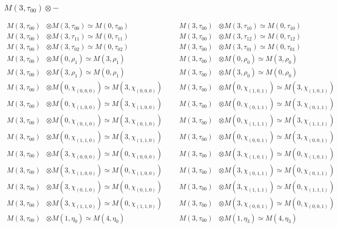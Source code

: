 \subsubsection{$ M(3,\tau_{00})\otimes -$}
\begin{align*}
M(3,\tau_{00}) &\otimes M(3,\tau_{00}) \simeq M(0,\tau_{00}) &&& M(3,\tau_{00}) &\otimes M(3,\tau_{10}) \simeq M(0,\tau_{10})\\
M(3,\tau_{00}) &\otimes M(3,\tau_{11}) \simeq M(0,\tau_{11}) &&& M(3,\tau_{00}) &\otimes M(3,\tau_{12}) \simeq M(0,\tau_{12})\\
M(3,\tau_{00}) &\otimes M(3,\tau_{02}) \simeq M(0,\tau_{02}) &&& M(3,\tau_{00}) &\otimes M(3,\tau_{01}) \simeq M(0,\tau_{01})\\
M(3,\tau_{00}) &\otimes M(0,\rho_{1}) \simeq M(3,\rho_{1}) &&& M(3,\tau_{00}) &\otimes M(0,\rho_{0}) \simeq M(3,\rho_{0})\\
M(3,\tau_{00}) &\otimes M(3,\rho_{1}) \simeq M(0,\rho_{1}) &&& M(3,\tau_{00}) &\otimes M(3,\rho_{0}) \simeq M(0,\rho_{0})\\
M(3,\tau_{00}) &\otimes M(0,\chi_{(0,0,0)}) \simeq M(3,\chi_{(0,0,0)}) &&& M(3,\tau_{00}) &\otimes M(0,\chi_{(1,0,1)}) \simeq M(3,\chi_{(1,0,1)})\\
M(3,\tau_{00}) &\otimes M(0,\chi_{(1,0,0)}) \simeq M(3,\chi_{(1,0,0)}) &&& M(3,\tau_{00}) &\otimes M(0,\chi_{(0,1,1)}) \simeq M(3,\chi_{(0,1,1)})\\
M(3,\tau_{00}) &\otimes M(0,\chi_{(0,1,0)}) \simeq M(3,\chi_{(0,1,0)}) &&& M(3,\tau_{00}) &\otimes M(0,\chi_{(1,1,1)}) \simeq M(3,\chi_{(1,1,1)})\\
M(3,\tau_{00}) &\otimes M(0,\chi_{(1,1,0)}) \simeq M(3,\chi_{(1,1,0)}) &&& M(3,\tau_{00}) &\otimes M(0,\chi_{(0,0,1)}) \simeq M(3,\chi_{(0,0,1)})\\
M(3,\tau_{00}) &\otimes M(3,\chi_{(0,0,0)}) \simeq M(0,\chi_{(0,0,0)}) &&& M(3,\tau_{00}) &\otimes M(3,\chi_{(1,0,1)}) \simeq M(0,\chi_{(1,0,1)})\\
M(3,\tau_{00}) &\otimes M(3,\chi_{(1,0,0)}) \simeq M(0,\chi_{(1,0,0)}) &&& M(3,\tau_{00}) &\otimes M(3,\chi_{(0,1,1)}) \simeq M(0,\chi_{(0,1,1)})\\
M(3,\tau_{00}) &\otimes M(3,\chi_{(0,1,0)}) \simeq M(0,\chi_{(0,1,0)}) &&& M(3,\tau_{00}) &\otimes M(3,\chi_{(1,1,1)}) \simeq M(0,\chi_{(1,1,1)})\\
M(3,\tau_{00}) &\otimes M(3,\chi_{(1,1,0)}) \simeq M(0,\chi_{(1,1,0)}) &&& M(3,\tau_{00}) &\otimes M(3,\chi_{(0,0,1)}) \simeq M(0,\chi_{(0,0,1)})\\
M(3,\tau_{00}) &\otimes M(1,\eta_{0}) \simeq M(4,\eta_{0}) &&& M(3,\tau_{00}) &\otimes M(1,\eta_{3}) \simeq M(4,\eta_{3})\\

\end{align*}
